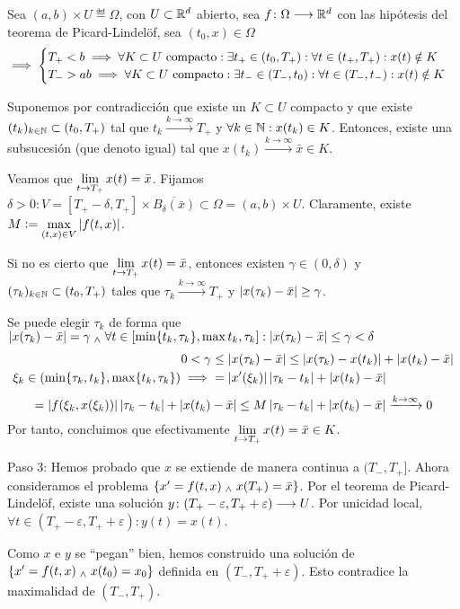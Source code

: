 \begin{teo}
	Sea $(a, b) \times U \eqdef \Omega$, con $U \subset \mathbb{R}^d$ abierto, sea $f \colon \Omega \longrightarrow \mathbb{R}^d$ con las hipótesis del teorema de Picard-Lindelöf, sea $(t_0, x) \in \Omega$
	\[\implies \begin{cases}
			T_+< b \implies \forall K \subset U \text{ compacto} : \exists t_+ \in (t_0, T_+) : \forall t \in (t_+, T_+) : x(t) \notin K  \\
			T_->a b \implies \forall K \subset U \text{ compacto} : \exists t_- \in (T_-, t_0) : \forall t \in (T_-, t_-) : x(t) \notin K \\
		\end{cases}\]
	\begin{dem}
		Suponemos por contradicción que existe un $K \subset U$ compacto y que existe $(t_k)_{k\in \mathbb{N}} \subset (t_0, T_+)$ tal que $t_k\xrightarrow{k\to\infty} T_+$ y $\forall k \in \mathbb{N} : x(t_k) \in K$.
		Entonces, existe una subsucesión (que denoto igual) tal que $x(t_k) \xrightarrow{k\to\infty} \bar{x} \in K$.

		Veamos que $\displaystyle \lim_{t\to T_+} x(t) = \bar{x}$. Fijamos $\delta > 0 : V = [T_+-\delta, T_+] \times \overline{B_{\delta}(\bar{x})} \subset \Omega = (a, b) \times U$. Claramente, existe $\displaystyle M\vcentcolon=\max_{(t, x) \in V} \left|f(t, x)\right|$.

		Si no es cierto que $\displaystyle \lim_{t\to T_+} x(t) = \bar{x}$, entonces existen $\gamma \in (0, \delta)$ y $(\tau_k)_{k\in\mathbb{N}}\subset (t_0, T_+)$ tales que $\tau_k \xrightarrow{k\to\infty} T_+$ y $\left|x(\tau_k) - \bar{x}\right| \geq \gamma$.

		Se puede elegir $\tau_k$ de forma que $\left|x(\tau_k) - \bar{x}\right| = \gamma \; _{\wedge} \; \forall t \in [\min\{t_k, \tau_k\}, \max{t_k, \tau_k}] : \left|x(\tau_k) - \bar{x}\right| \leq \gamma < \delta$
		\[\begin{aligned}
			0 < \gamma &\leq \left|x(\tau_k) - \bar{x}\right| \leq \left|x(\tau_k) - x(t_k)\right| + \left|x(t_k) - \bar{x}\right| \\
			\xi_k \in (\min\{\tau_k, t_k\}, \max\{t_k, \tau_k\}) \implies &= \left|x'(\xi_k)\right|\left|\tau_k - t_k\right| + \left|x(t_k) - \bar{x}\right| 
		\end{aligned}\]
		\[= \left|f(\xi_k, x(\xi_k))\right|\left|\tau_k - t_k\right| + \left|x(t_k) - \bar{x}\right| \leq M\left|\tau_k - t_k\right| + \left|x(t_k) - \bar{x}\right| \xrightarrow{k\to\infty} 0\]
		Por tanto, concluimos que efectivamente $\displaystyle \lim_{t\to T_+} x(t) = \bar{x} \in K$.

		Paso 3: Hemos probado que $x$ se extiende de manera continua a $(T_-, T_+]$. Ahora consideramos el problema $\{x'=f(t, x) \; _{\wedge} \; x(T_+) = \bar{x}\}$. Por el teorema de Picard-Lindelöf, existe una solución $y \colon (T_+ - \varepsilon, T_+ + \varepsilon) \longrightarrow U$. Por unicidad local, $\forall t \in (T_+-\varepsilon, T_+ + \varepsilon) : y(t) = x(t)$.

		Como $x$ e $y$ se ``pegan'' bien, hemos construido una solución de $\{x'=f(t, x) \; _{\wedge} \; x(t_0) = x_0\}$ definida en $(T_-, T_+ + \varepsilon)$. Esto contradice la maximalidad de $(T_-, T_+)$. 
	\end{dem}
\end{teo}

